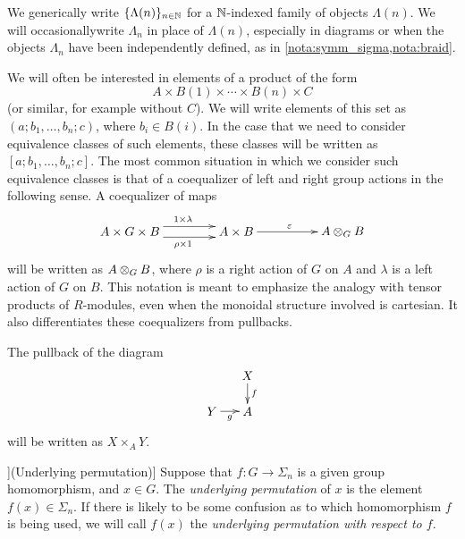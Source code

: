 \begin{conv}\label{conv:indexed}
We generically write $\{ \Lambda(n) \}_{n \in \N}$ for a $\N$-indexed family of objects $\Lambda(n)$. We will occasionallywrite $\Lambda_n$ in place of $\Lambda(n)$, especially in diagrams or when the objects $\Lambda_n$ have been independently defined, as in \cref{nota:symm_sigma,nota:braid}.
\end{conv}

\begin{conv}\label{conv:coeq}
We will often be interested in elements of a product of the form
\[
A \times B(1) \times \cdots \times B(n) \times C
\]
(or similar, for example without $C$). We will write elements of this set as $(a; b_{1}, \ldots, b_{n}; c)$, where $b_i \in B(i)$. 
In the case that we need to consider equivalence classes of such elements, these classes will be written as $[a; b_{1}, \ldots, b_{n}; c]$. 
The most common situation in which we consider such equivalence classes is that of a coequalizer of left and right group actions in the following sense. 
A coequalizer of maps
    \[
        \xy
            (0,0)*+{A \times G \times B}="00";
            (30,0)*+{A \times B}="10";
            (60,0)*+{\coeqb{A}{B}{G}}="20";
            {\ar@<1ex>^{1 \times \lambda} "00" ; "10"};
            {\ar@<-1ex>_{\rho \times 1} "00" ; "10"};
            {\ar^{\varepsilon} "10" ; "20"};
        \endxy
    \]
will be written as $\coeqb{A}{B}{G}$, where $\rho$ is a right action of $G$ on $A$ and $\lambda$ is a left action of $G$ on $B$. 
This notation is meant to emphasize the analogy with tensor products of $R$-modules, even when the monoidal structure involved is cartesian.
It also differentiates these coequalizers from pullbacks.
\end{conv}


\begin{conv}[(Pullbacks)]\label{conv:pb}
The pullback of the diagram
    \[
        \xy
            (10,0)*+{X}="00";
            (0,-10)*+{Y}="10";
            (10,-10)*+{A}="20";
            {\ar^{f} "00" ; "20"};
            {\ar_{g} "10" ; "20"};
        \endxy
    \]
will be written as $X \times_A Y$. 
\end{conv}

\begin{Defi}](Underlying permutation)]\label{Defi:underlying-perm}
Suppose that $f \colon G \to \Sigma_n$ is a given group homomorphism, and $x \in G$. The \emph{underlying permutation} of $x$ is the element $f(x) \in \Sigma_n$. If there is likely to be some confusion as to which homomorphism $f$ is being used, we will call $f(x)$ the \emph{underlying permutation with respect to $f$}.
\end{Defi}

